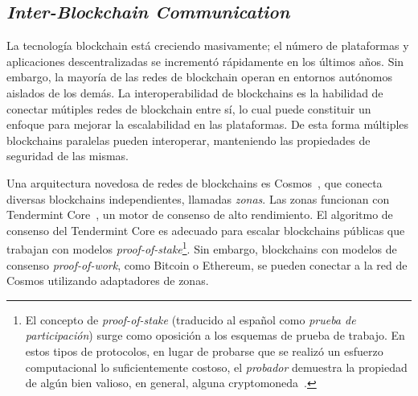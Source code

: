 
\subsection{\emph{Inter-Blockchain Communication}}
La tecnología blockchain está creciendo masivamente; el número de plataformas y
aplicaciones descentralizadas se incrementó rápidamente en los últimos años.
%
Sin embargo, la mayoría de las redes de blockchain operan en entornos autónomos aislados
de los demás.
%
La interoperabilidad de blockchains es la habilidad de conectar mútiples redes de
blockchain entre sí, lo cual puede constituir un enfoque para mejorar la escalabilidad en
las plataformas.
%
De esta forma múltiples blockchains paralelas pueden interoperar, manteniendo las
propiedades de seguridad de las mismas.

Una arquitectura novedosa de redes de blockchains es Cosmos~\cite{cosmos}, que conecta diversas
blockchains independientes, llamadas \emph{zonas}.
%
Las zonas funcionan con Tendermint Core~\cite{Buchman.2018.Tendermint}, un motor de consenso de alto rendimiento.
%
El algoritmo de consenso del Tendermint Core es adecuado para escalar blockchains públicas que
trabajan con modelos \emph{proof-of-stake}\footnote{El concepto de \emph{proof-of-stake} (traducido al español
como \emph{prueba de participación}) surge como oposición a los esquemas de prueba de trabajo.
En estos tipos de protocolos, en lugar de probarse que se realizó un esfuerzo computacional lo suficientemente
costoso, el \emph{probador} demuestra la propiedad de algún bien valioso, en general, alguna cryptomoneda~\cite{King2012PPCoinPC}.}.
%
Sin embargo, blockchains con modelos de consenso \emph{proof-of-work}, como Bitcoin o Ethereum,
se pueden conectar a la red de Cosmos utilizando adaptadores de zonas.

